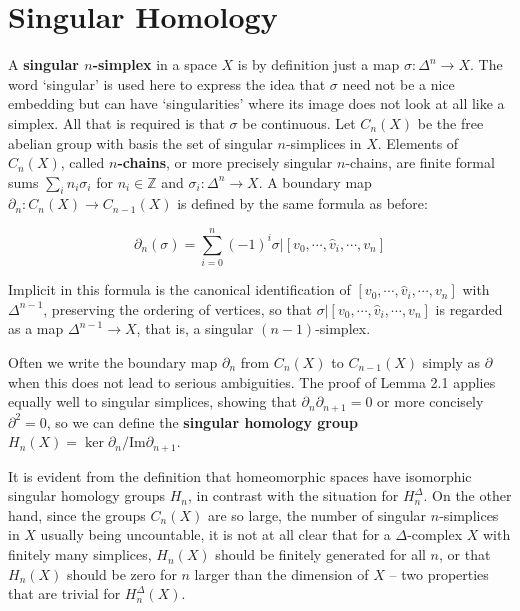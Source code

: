 \section*{Singular Homology}

A \textbf{singular $n$-simplex} in a space $X$ is by definition just a map $\sigma:\Delta^n \to X$. The
word `singular' is used here to express the idea that $\sigma$ need not be a nice embedding
but can have `singularities' where its image does not look at all like a simplex. All that
is required is that $\sigma$ be continuous. Let $C_n(X)$ be the free abelian group with basis
the set of singular $n$-simplices in $X$. Elements of $C_n(X)$, called \textbf{$n$-chains}, or more
precisely singular $n$-chains, are finite formal sums $\sum_i n_i \sigma_i$ for $n_i \in \mathbb{Z}$ and $\sigma_i:\Delta^n \to X$.
A boundary map $\partial_n : C_n(X) \to C_{n-1}(X)$ is defined by the same formula as before:

$$\partial_n(\sigma) = \sum_{i=0}^{n} (-1)^i \sigma|[v_0, \cdots, \hat{v}_i, \cdots, v_n]$$

Implicit in this formula is the canonical identification of $[v_0, \cdots, \hat{v}_i, \cdots, v_n]$ with
$\Delta^{n-1}$, preserving the ordering of vertices, so that $\sigma|[v_0, \cdots, \hat{v}_i, \cdots, v_n]$ is regarded
as a map $\Delta^{n-1} \to X$, that is, a singular $(n-1)$-simplex.

Often we write the boundary map $\partial_n$ from $C_n(X)$ to $C_{n-1}(X)$ simply as $\partial$ when
this does not lead to serious ambiguities. The proof of Lemma 2.1 applies equally well
to singular simplices, showing that $\partial_n \partial_{n+1} = 0$ or more concisely $\partial^2 = 0$, so we can
define the \textbf{singular homology group} $H_n(X) = \ker\partial_n / \text{Im}\partial_{n+1}$.

It is evident from the definition that homeomorphic spaces have isomorphic singular
homology groups $H_n$, in contrast with the situation for $H^\Delta_n$. On the other hand,
since the groups $C_n(X)$ are so large, the number of singular $n$-simplices in $X$ usually
being uncountable, it is not at all clear that for a $\Delta$-complex $X$ with finitely many simplices, $H_n(X)$ should be finitely generated for all $n$, or that $H_n(X)$ should be zero
for $n$ larger than the dimension of $X$ -- two properties that are trivial for $H^\Delta_n(X)$.

